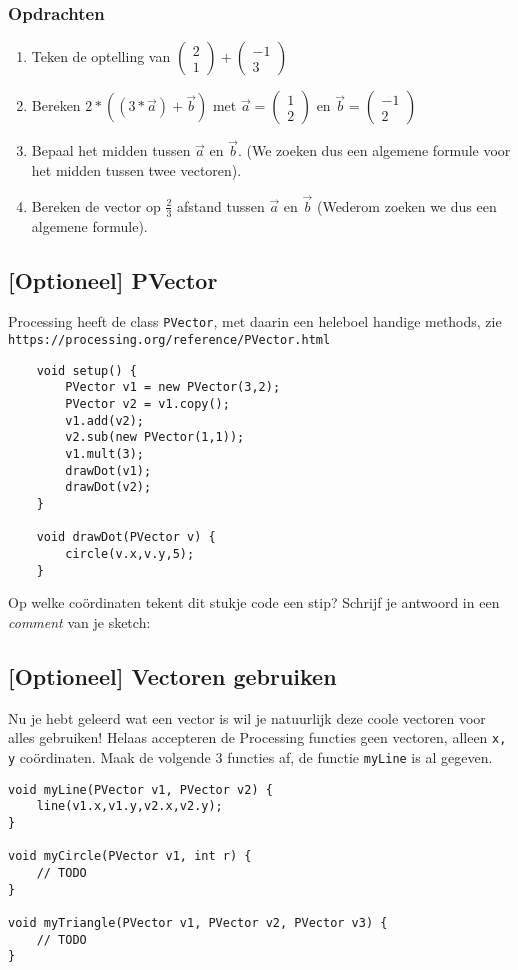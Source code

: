 \documentclass[../syllabus.tex]{subfiles}
\begin{document}
\subsubsection{Opdrachten}
\begin{enumerate}
	\item Teken de optelling van $\begin{pmatrix}2\\1\end{pmatrix}+\begin{pmatrix}-1\\3\end{pmatrix}$
	\item Bereken $2*((3*\vec{a})+\vec{b})$ met $\vec{a}=\begin{pmatrix}1\\2\end{pmatrix}$ en $\vec{b} = \begin{pmatrix}-1\\2\end{pmatrix}$
	\item Bepaal het midden tussen $\vec{a}$ en $\vec{b}$. (We zoeken dus een algemene formule voor het midden tussen twee vectoren).
	\item Bereken de vector op $\frac{2}{3}$ afstand tussen $\vec{a}$ en $\vec{b}$ (Wederom zoeken we dus een algemene formule).
\end{enumerate}

\subsection{[Optioneel] PVector}
Processing heeft de class \texttt{PVector}, met daarin een heleboel handige methods, zie \texttt{https://processing.org/reference/PVector.html}
\begin{lstlisting}
	void setup() {
		PVector v1 = new PVector(3,2);
		PVector v2 = v1.copy();
		v1.add(v2);
		v2.sub(new PVector(1,1));
		v1.mult(3);
		drawDot(v1);
		drawDot(v2);
	}
	
	void drawDot(PVector v) {
		circle(v.x,v.y,5);
	}
\end{lstlisting}
Op welke co\"ordinaten tekent dit stukje code een stip?
Schrijf je antwoord in een \textit{comment} van je sketch:

\subsection{[Optioneel] Vectoren gebruiken}
Nu je hebt geleerd wat een vector is wil je natuurlijk deze coole vectoren voor alles gebruiken! Helaas accepteren de Processing functies geen vectoren, alleen \texttt{x, y} co\"ordinaten. Maak de volgende 3 functies af, de functie \texttt{myLine} is al gegeven.
\begin{lstlisting}
void myLine(PVector v1, PVector v2) {
    line(v1.x,v1.y,v2.x,v2.y);
}

void myCircle(PVector v1, int r) {
    // TODO
}

void myTriangle(PVector v1, PVector v2, PVector v3) {
    // TODO
}
\end{lstlisting}
\end{document}

